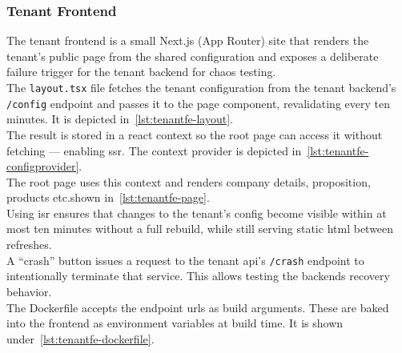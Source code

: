 \documentclass[11pt, a4paper, oneside, listof=totoc]{scrartcl}
\begin{document}
            \subsubsection{Tenant Frontend}\label{subsubsec:tenantFrontend}
                The tenant frontend is a small Next.js (App Router) site that renders the tenant's
                public page from the shared configuration and exposes a deliberate failure trigger
                for the tenant backend for chaos testing.\\
                The \texttt{layout.tsx} file fetches the tenant configuration from the tenant
                backend's \texttt{/config} endpoint and passes it to the page component,
                revalidating every ten minutes. 
                It is depicted in~\autoref{lst:tenantfe-layout}.\\
                The result is stored in a react context so the root page can access it without
                fetching --- enabling \gls{ssr}.
                The context provider is depicted in~\autoref{lst:tenantfe-configprovider}.\\
                The root page uses this context and renders company details, proposition,
                products etc.\@as shown in~\autoref{lst:tenantfe-page}.\\
                Using \gls{isr} ensures that changes to the tenant's config become visible within
                at most ten minutes without a full rebuild, while still serving static \gls{html}
                between refreshes.\\
                A \enquote{crash} button issues a request to the tenant \gls{api}'s \texttt{/crash}
                endpoint to intentionally terminate that service.
                This allows testing the backends recovery behavior.\\
                The Dockerfile accepts the endpoint \glspl{url} as build arguments.
                These are baked into the frontend as environment variables at build time.
                It is shown under~\autoref{lst:tenantfe-dockerfile}.
\end{document}
